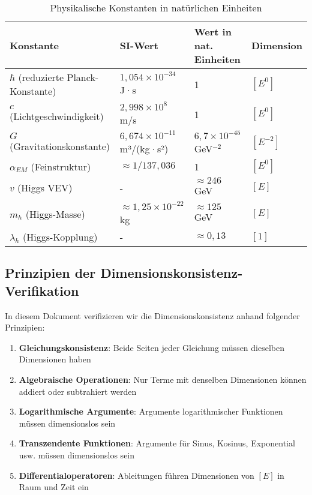 \documentclass[12pt,a4paper]{article}
\begin{document}
	\begin{table}[htbp]
		\footnotesize
		\centering
		\begin{tabular}{p{5cm}p{4.5cm}p{5.5cm}p{1.5cm}}
			\toprule
			\textbf{Konstante} & \textbf{SI-Wert} & \textbf{Wert in nat. Einheiten} & \textbf{Dimension} \\
			\midrule
			$\hbar$ (reduzierte Planck-Konstante) & $1,054 \times 10^{-34}$ J·s & 1 & $[E^0]$ \\
			$c$ (Lichtgeschwindigkeit) & $2,998 \times 10^8$ m/s & 1 & $[E^0]$ \\
			$G$ (Gravitationskonstante) & $6,674 \times 10^{-11}$ m³/(kg·s²) & $6,7 \times 10^{-45}$ GeV$^{-2}$ & $[E^{-2}]$ \\
			$\alpha_{EM}$ (Feinstruktur) & $\approx 1/137,036$ & 1 & $[E^0]$ \\
			$v$ (Higgs VEV) & - & $\approx 246$ GeV & $[E]$ \\
			$m_h$ (Higgs-Masse) & $\approx 1,25 \times 10^{-22}$ kg & $\approx 125$ GeV & $[E]$ \\
			$\lambda_h$ (Higgs-Kopplung) & - & $\approx 0,13$ & $[1]$ \\
			\bottomrule
		\end{tabular}
		\caption{Physikalische Konstanten in natürlichen Einheiten}
	\end{table}
	
	\subsection{Prinzipien der Dimensionskonsistenz-Verifikation}
	
	In diesem Dokument verifizieren wir die Dimensionskonsistenz anhand folgender Prinzipien:
	
	\begin{enumerate}
		\item \textbf{Gleichungskonsistenz}: Beide Seiten jeder Gleichung müssen dieselben Dimensionen haben
		\item \textbf{Algebraische Operationen}: Nur Terme mit denselben Dimensionen können addiert oder subtrahiert werden
		\item \textbf{Logarithmische Argumente}: Argumente logarithmischer Funktionen müssen dimensionslos sein
		\item \textbf{Transzendente Funktionen}: Argumente für Sinus, Kosinus, Exponential usw. müssen dimensionslos sein
		\item \textbf{Differentialoperatoren}: Ableitungen führen Dimensionen von $[E]$ in Raum und Zeit ein
	\end{enumerate}
	
\end{document}
